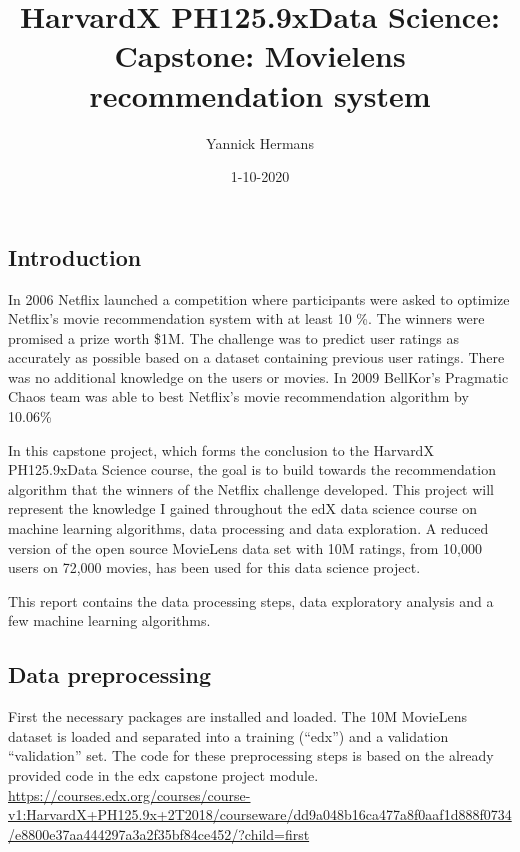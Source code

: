 \documentclass[
]{article}
\title{HarvardX PH125.9xData Science: Capstone: Movielens recommendation system}
\author{Yannick Hermans}
\date{1-10-2020}
\begin{document}
\maketitle

\hypertarget{introduction}{%
\subsection{Introduction}\label{introduction}}

In 2006 Netflix launched a competition where participants were asked to
optimize Netflix's movie recommendation system with at least 10 \%. The
winners were promised a prize worth \$1M. The challenge was to predict
user ratings as accurately as possible based on a dataset containing
previous user ratings. There was no additional knowledge on the users or
movies. In 2009 BellKor's Pragmatic Chaos team was able to best
Netflix's movie recommendation algorithm by 10.06\%

In this capstone project, which forms the conclusion to the HarvardX
PH125.9xData Science course, the goal is to build towards the
recommendation algorithm that the winners of the Netflix challenge
developed. This project will represent the knowledge I gained throughout
the edX data science course on machine learning algorithms, data
processing and data exploration. A reduced version of the open source
MovieLens data set with 10M ratings, from 10,000 users on 72,000 movies,
has been used for this data science project.

This report contains the data processing steps, data exploratory
analysis and a few machine learning algorithms.

\hypertarget{data-preprocessing}{%
\subsection{Data preprocessing}\label{data-preprocessing}}

First the necessary packages are installed and loaded. The 10M MovieLens
dataset is loaded and separated into a training (``edx'') and a
validation ``validation'' set. The code for these preprocessing steps is
based on the already provided code in the edx capstone project module.
\url{https://courses.edx.org/courses/course-v1:HarvardX+PH125.9x+2T2018/courseware/dd9a048b16ca477a8f0aaf1d888f0734/e8800e37aa444297a3a2f35bf84ce452/?child=first}
\end{document}
